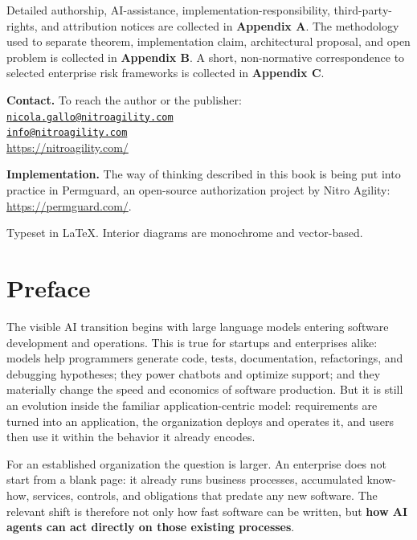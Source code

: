 \documentclass[10pt,oneside,openany]{book}
\begin{document}
{Detailed authorship, AI-assistance, implementation-responsibility, third-party-rights, and attribution notices are collected in \textbf{Appendix A}. The methodology used to separate theorem, implementation claim, architectural proposal, and open problem is collected in \textbf{Appendix B}. A short, non-normative correspondence to selected enterprise risk frameworks is collected in \textbf{Appendix C}.\par

\textbf{Contact.} To reach the author or the publisher:\\
\href{mailto:nicola.gallo@nitroagility.com}{\nolinkurl{nicola.gallo@nitroagility.com}}\\
\href{mailto:info@nitroagility.com}{\nolinkurl{info@nitroagility.com}}\\
\url{https://nitroagility.com/}\par

\textbf{Implementation.} The way of thinking described in this book is being put into practice in Permguard, an open-source authorization project by Nitro Agility: \url{https://permguard.com/}.\par
}

\vfill
{\footnotesize Typeset in LaTeX. Interior diagrams are monochrome and vector-based.}
\clearpage

\chapter*{Preface}
The visible AI transition begins with large language models entering software development and operations. This is true for startups and enterprises alike: models help programmers generate code, tests, documentation, refactorings, and debugging hypotheses; they power chatbots and optimize support; and they materially change the speed and economics of software production. But it is still an evolution inside the familiar application-centric model: requirements are turned into an application, the organization deploys and operates it, and users then use it within the behavior it already encodes.

For an established organization the question is larger. An enterprise does not start from a blank page: it already runs business processes, accumulated know-how, services, controls, and obligations that predate any new software. The relevant shift is therefore not only how fast software can be written, but \textbf{how AI agents can act directly on those existing processes}.
\end{document}
